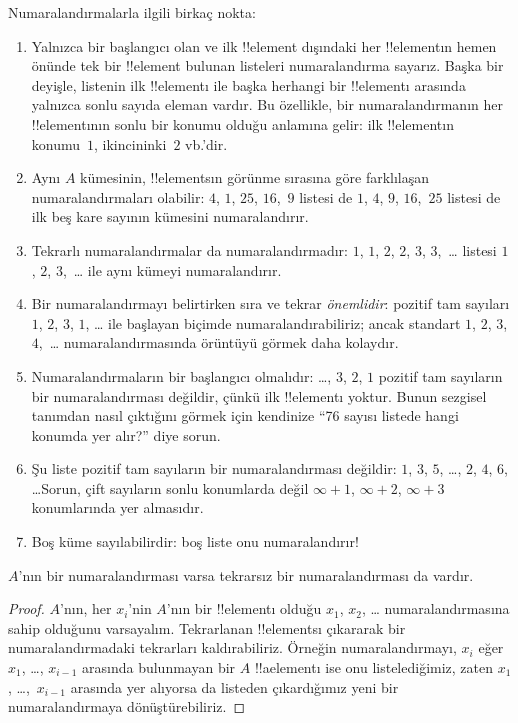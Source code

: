 \documentclass[../../../include/open-logic-section]{subfiles}
\begin{document}
\begin{explain}
Numaralandırmalarla ilgili birkaç nokta:
\begin{enumerate}
\item Yalnızca bir başlangıcı olan ve ilk !!{element} dışındaki her
  !!{element}{}ın hemen önünde tek bir !!{element} bulunan listeleri
  numaralandırma sayarız. Başka bir deyişle, listenin ilk !!{element}{}ı ile
  başka herhangi bir !!{element}{}ı arasında yalnızca sonlu sayıda eleman
  vardır. Bu özellikle, bir numaralandırmanın her !!{element}{}ının sonlu bir
  konumu olduğu anlamına gelir: ilk !!{element}{}ın konumu~$1$, ikincininki~$2$
  vb.'dir.
\item Aynı $A$ kümesinin, !!{element}s{}ın görünme sırasına göre farklılaşan
  numaralandırmaları olabilir: $4$, $1$, $25$, $16$,~$9$ listesi de $1$,
  $4$, $9$, $16$,~$25$ listesi de ilk beş kare sayının kümesini numaralandırır.
\item Tekrarlı numaralandırmalar da numaralandırmadır: $1$, $1$, $2$, $2$,
  $3$, $3$,~\dots{} listesi $1$, $2$, $3$,~\dots{} ile aynı kümeyi
  numaralandırır.
\item Bir numaralandırmayı belirtirken sıra ve tekrar \emph{önemlidir}:
  pozitif tam sayıları $1$, $2$, $3$, $1$, \dots{} ile başlayan biçimde
  numaralandırabiliriz; ancak standart $1$, $2$, $3$, $4$,~\dots{}
  numaralandırmasında örüntüyü görmek daha kolaydır.
\item Numaralandırmaların bir başlangıcı olmalıdır: \dots, $3$, $2$, $1$
  pozitif tam sayıların bir numaralandırması değildir, çünkü ilk
  !!{element}{}ı yoktur. Bunun sezgisel tanımdan nasıl çıktığını görmek için
  kendinize ``76 sayısı listede hangi konumda yer alır?'' diye sorun.
\item Şu liste pozitif tam sayıların bir numaralandırması değildir: $1$, $3$,
  $5$, \dots, $2$, $4$, $6$, \dots\@ Sorun, çift sayıların sonlu konumlarda
  değil $\infty + 1$, $\infty + 2$, $\infty + 3$ konumlarında yer almasıdır.
\item Boş küme sayılabilirdir: boş liste onu numaralandırır!{}
\end{enumerate}
\end{explain}

\begin{prop}
  $A$'nın bir numaralandırması varsa tekrarsız bir numaralandırması da vardır.
\end{prop}

\begin{proof}
  $A$'nın, her $x_i$'nin $A$'nın bir !!{element}{}ı olduğu $x_1$, $x_2$,
  \dots{} numaralandırmasına sahip olduğunu varsayalım. Tekrarlanan
  !!{element}s{}ı çıkararak bir numaralandırmadaki tekrarları kaldırabiliriz.
  Örneğin numaralandırmayı, $x_i$ eğer $x_1$, \dots, $x_{i-1}$ arasında
  bulunmayan bir $A$ !!a{element}{}ı ise onu listelediğimiz, zaten $x_1$,
  \dots,~$x_{i-1}$ arasında yer alıyorsa da listeden çıkardığımız yeni bir
  numaralandırmaya dönüştürebiliriz.
\end{proof}
\end{document}
